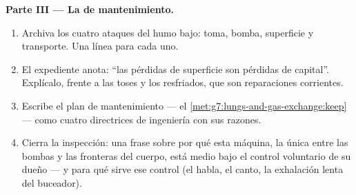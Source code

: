 \begin{problem}
\medskip\noindent\textbf{Parte III --- La  de mantenimiento.}
\begin{enumerate}[resume]
  \item Archiva los cuatro ataques del humo bajo: toma, bomba,
        superficie y transporte. Una línea para cada uno.
  \item El expediente anota: ``las pérdidas de superficie son pérdidas
        de capital''. Explícalo, frente a las toses y los resfriados,
        que son reparaciones corrientes.
  \item Escribe el plan de mantenimiento --- el
        \cref{met:g7:lungs-and-gas-exchange:keep} --- como cuatro
        directrices de ingeniería con sus razones.
  \item Cierra la inspección: una frase sobre por qué esta máquina, la
        única entre las bombas y las fronteras del cuerpo, está medio
        bajo el control voluntario de su dueño --- y para qué sirve ese
        control (el habla, el canto, la exhalación lenta del buceador).
\end{enumerate}
\end{problem}
